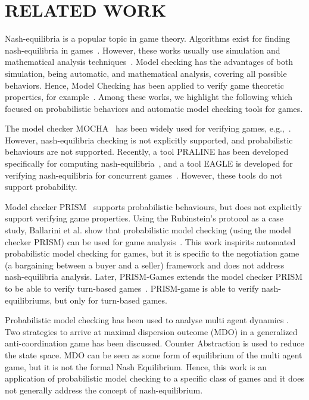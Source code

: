 \section{RELATED WORK}

Nash-equilibria is a popular topic in game theory. Algorithms exist for finding nash-equilibria in games~\cite{FPT04, DMP07, Daskalakis13}. However, these works usually use simulation and mathematical analysis techniques~\cite{BFW06}. Model checking has the advantages of both simulation, being automatic, and mathematical analysis, covering all possible behaviors.
Hence, Model Checking has been applied to verify game theoretic properties, for example~\cite{Henzinger98, AM04, LR06}. Among these works, we highlight the following which focused on probabilistic behaviors and automatic model checking tools for games.

The model checker MOCHA~\cite{AHM98} has been widely used for verifying games, e.g.,~\cite{KR03, MS05, ZZPM12}. However, nash-equilibria checking is not explicitly supported, and probabilistic behaviours are not supported.
Recently, a tool PRALINE has been developed specifically for computing nash-equilibria~\cite{Brenguier13}, and a tool EAGLE is developed for verifying nash-equilibria for concurrent games~\cite{TGW15}. However, these tools do not support probability.

Model checker PRISM~\cite{KNP11} supports probabilistic behaviours, but does not explicitly support verifying game properties.
Using the Rubinstein's protocol as a case study, Ballarini et al. show that probabilistic model checking (using the model checker PRISM) can be used for game analysis~\cite{BFW06}. This work inspirits automated probabilistic model checking for games, but it is specific to the negotiation game (a bargaining between a buyer and a seller) framework and does not address nash-equilibria analysis.
Later, PRISM-Games extends the model checker PRISM to be able to verify turn-based games~\cite{CFK13}. PRISM-game is able to verify nash-equilibriums, but only for turn-based games.

Probabilistic model checking has been used to analyse multi agent dynamics \cite{hao2012probabilistic} . Two strategies to arrive at maximal dispersion outcome (MDO) \cite{hao2012probabilistic} in a generalized anti-coordination game has been discussed. Counter Abstraction is used to reduce the state space. MDO can be seen as some form of equilibrium of the multi agent game, but it is not the formal Nash Equilibrium. Hence, this work is an application of probabilistic model checking to a specific class of games and it does not generally address the concept of nash-equilibrium.  


